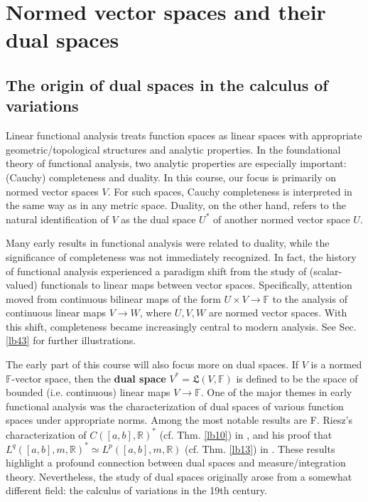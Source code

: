 \documentclass[12pt,b5paper,notitlepage]{article}
\theoremstyle{definition}
\theoremstyle{plain}
\newcommand{\fk}{\mathfrak}
\newcommand{\Rbb}{\mathbb R}
\newcommand{\Fbb}{\mathbb F}
\numberwithin{equation}{section}
\begin{document}
\section{Normed vector spaces and their dual spaces}


\subsection{The origin of dual spaces in the calculus of variations}\label{lb24}



Linear functional analysis treats function spaces as linear spaces with appropriate geometric/topological structures and analytic properties. In the foundational theory of functional analysis, two analytic properties are especially important: (Cauchy) completeness and duality. In this course, our focus is primarily on normed vector spaces $V$. For such spaces, Cauchy completeness is interpreted in the same way as in any metric space. Duality, on the other hand, refers to the natural identification of $V$ as the dual space $U^*$ of another normed vector space $U$.



Many early results in functional analysis were related to duality, while the significance of completeness was not immediately recognized. In fact, the history of functional analysis experienced a paradigm shift from the study of (scalar-valued) functionals to linear maps between vector spaces. Specifically, attention moved from continuous bilinear maps of the form $U \times V \rightarrow \mathbb{F}$ to the analysis of continuous linear maps $V \rightarrow W$, where $U,V,W$ are normed vector spaces. With this shift, completeness became increasingly central to modern analysis. See Sec. \ref{lb43} for further illustrations.




The early part of this course will also focus more on dual spaces. If $V$ is a normed $\Fbb$-vector space, then the \textbf{dual space} $V^*=\fk L(V,\Fbb)$ is defined to be the space of bounded (i.e. continuous) linear maps $V\rightarrow\Fbb$. One of the major themes in early functional analysis was the characterization of dual spaces of various function spaces under appropriate norms. Among the most notable results are F. Riesz's characterization of $C([a,b], \Rbb)^*$ (cf. Thm. \ref{lb10}) in \cite{Rie09, Rie11}, and his proof that $L^q([a,b],m, \Rbb)^* \simeq L^p([a,b],m, \Rbb)$ (cf. Thm. \ref{lb13}) in \cite{Rie10}. These results highlight a profound connection between dual spaces and measure/integration theory. Nevertheless, the study of dual spaces originally arose from a somewhat different field: the calculus of variations in the 19th century.
\end{document}
